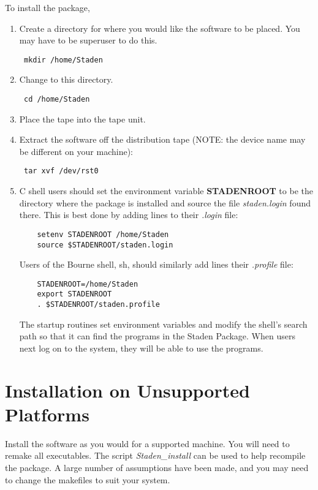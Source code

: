To install the package,
\begin{enumerate}
\item Create a directory for where you would like the software to be
placed. You may have to be superuser to do this.
      \begin{verbatim} mkdir /home/Staden\end{verbatim}
\item Change to this directory.
      \begin{verbatim} cd /home/Staden\end{verbatim}
\item Place the tape into the tape unit.
\item Extract the software off the distribution tape (NOTE: the device name may be
different on your machine):
      \begin{verbatim} tar xvf /dev/rst0\end{verbatim}
\item C shell users should set the environment variable {\bf STADENROOT}
to be the directory where the package is installed and source the file
{\em staden.login} found there. This is best done by adding lines to their
{\em .login} file:
\begin{verbatim}
    setenv STADENROOT /home/Staden
    source $STADENROOT/staden.login
\end{verbatim}
Users of the Bourne shell, sh, should similarly add lines their {\em .profile} file:
\begin{verbatim}  
    STADENROOT=/home/Staden
    export STADENROOT
    . $STADENROOT/staden.profile
\end{verbatim}

The startup routines set environment variables and modify the shell's
search path so that it can find the programs in the Staden Package.
When users next log on to the system, they will be able to use the
programs.

\end{enumerate}


\section {Installation on Unsupported Platforms}

Install the software as you would for a supported machine.  You will
need to remake all executables.  The script {\em Staden\_install} can
be used to help recompile the package. A large number of
assumptions have been made, and you may need to change the makefiles
to suit your system.

